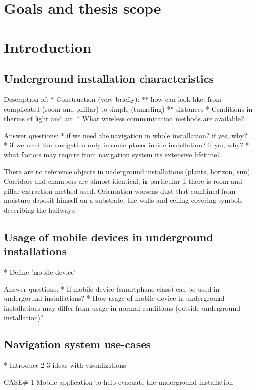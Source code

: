 \documentclass[../main.tex]{subfiles}
\begin{document}
\chapter{Goals and thesis scope}



\chapter{Introduction}

\section{Underground installation characteristics}

Description of:
* Construction (very briefly):
** how can look like: from complicated (room and phillar) to simple (tunneling)
** distances
* Conditions in therms of light and air.
* What wireless communication methods are available?

Answer questions:
* if we need the navigation in whole installation? if yes, why?
* if we need the navigation only in some places inside installation? if yes, why?
* what factors may require from navigation system its extensive lifetime?

There are no reference objects in underground installations (plants, horizon, sun). Corridors and chambers are almost identical, in particular if there is room-and-pillar extraction method used. Orientation worsens dust that combined from moisture deposit himself on a substrate, the walls and ceiling covering symbols describing the hallways.


\section{Usage of mobile devices in underground installations}
* Define 'mobile device'

Answer questions:
* If mobile device (smartphone class) can be used in undergorund installations?
* How usage of mobile device in underground installations may differ from usage in normal conditions (outside underground installation)?

\section{Navigation system use-cases}
* Introduce 2-3 ideas with visualizations

CASE# 1 Mobile application to help evacuate the underground installation
\end{document}
